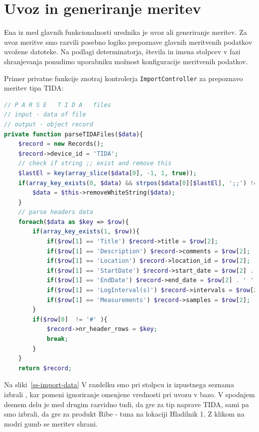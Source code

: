 \documentclass[a4paper, 12pt]{book}
\begin{document}
\newpage

\section{Uvoz in generiranje meritev}
\label{uvoz-in-generiranje-meritev}

Ena iz med glavnih funkcionalnosti urednika je uvoz ali generiranje meritev. 
Za uvoz meritve smo razvili posebno logiko prepoznave glavnih meritvenih podatkov uvožene datoteke. Na podlagi determinatorja, števila in imena stolpcev v fazi shranjevanja ponudimo uporabniku možnost konfiguracije meritvenih podatkov.

\newpage

Primer privatne funkcije znotraj kontrolerja \verb=ImportController= za prepoznavo meritev tipa TIDA:

\begin{lstlisting}[language=PHP, style=mystyle]
// P A R S E   T I D A   files
// input - data of file
// output - object record
private function parseTIDAFiles($data){
    $record = new Records();
    $record->device_id = 'TIDA';
    // check if string ;; exist and remove this
    $lastEl = key(array_slice($data[0], -1, 1, true));
    if(array_key_exists(0, $data) && strpos($data[0][$lastEl], ';;') !== false){
        $data = $this->removeWhiteString($data);
    }
    // parse headers data
    foreach($data as $key => $row){
        if(array_key_exists(1, $row)){
            if($row[1] == 'Title') $record->title = $row[2];
            if($row[1] == 'Description') $record->comments = $row[2];
            if($row[1] == 'Location') $record->location_id = $row[2];
            if($row[1] == 'StartDate') $record->start_date = $row[2] . ' ' . $row[3];
            if($row[1] == 'EndDate') $record->end_date = $row[2] . ' ' . $row[3];
            if($row[1] == 'LogInterval(s)') $record->intervals = $row[2];
            if($row[1] == 'Measurements') $record->samples = $row[2];
        }
        if($row[0]  != '#' ){ 
            $record->nr_header_rows = $key; 
            break;
        }
    }
    return $record;
\end{lstlisting}


Na sliki~\ref{ss-import-data} V razdelku  smo pri stolpcu  iz izpustnega seznama izbrali , kar pomeni ignoriranje omenjene vrednosti pri uvozu v bazo. V spodnjem desnem delu je med drugim razvidno tudi, da gre za tip naprave TIDA, sami pa smo izbrali, da gre za produkt Ribe - tuna na lokaciji Hladilnik 1. Z klikom na modri gumb  se meritev shrani.
\end{document}

